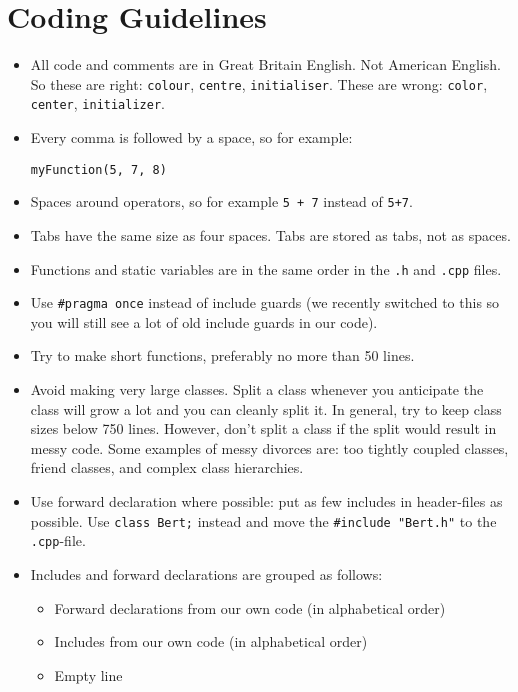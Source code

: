 \documentclass{article}
\begin{document}
\section*{Coding Guidelines}

\begin{itemize}
    \item All code and comments are in Great Britain English. Not American English. So these are right: \texttt{colour}, \texttt{centre}, \texttt{initialiser}. These are wrong: \texttt{color}, \texttt{center}, \texttt{initializer}.
    \item Every comma is followed by a space, so for example:
    \begin{Verbatim}[fontsize=\small]
    myFunction(5, 7, 8)
    \end{Verbatim}
    \item Spaces around operators, so for example \texttt{5 + 7} instead of \texttt{5+7}.
    \item Tabs have the same size as four spaces. Tabs are stored as tabs, not as spaces.
    \item Functions and static variables are in the same order in the \texttt{.h} and \texttt{.cpp} files.
    \item Use \texttt{\#pragma once} instead of include guards (we recently switched to this so you will still see a lot of old include guards in our code).
    \item Try to make short functions, preferably no more than 50 lines.
    \item Avoid making very large classes. Split a class whenever you anticipate the class will grow a lot and you can cleanly split it. In general, try to keep class sizes below 750 lines. However, don't split a class if the split would result in messy code. Some examples of messy divorces are: too tightly coupled classes, friend classes, and complex class hierarchies.
    \item Use forward declaration where possible: put as few includes in header-files as possible. Use \texttt{class Bert;} instead and move the \texttt{\#include "Bert.h"} to the \texttt{.cpp}-file.
    \item Includes and forward declarations are grouped as follows:
    \begin{itemize}
        \item Forward declarations from our own code (in alphabetical order)
        \item Includes from our own code (in alphabetical order)
        \item Empty line

\end{itemize}
\end{itemize}
\end{document}
